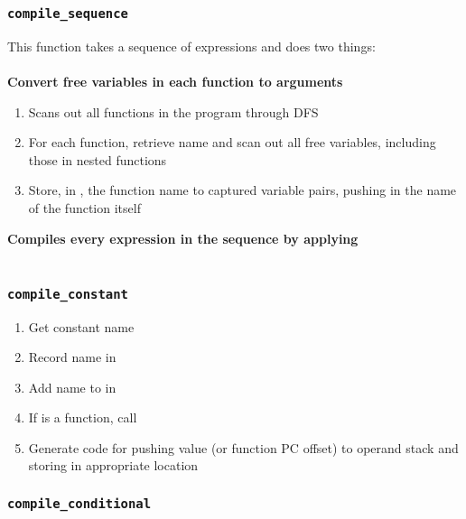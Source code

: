 \subsubsection{\texttt{compile\_sequence}}
This function takes a sequence of expressions and does two things: \\\\
\textbf{Convert free variables in each function to arguments}
\begin{enumerate}
    \item Scans out all functions in the program through DFS
    \item For each function, retrieve name and scan out all free variables, including those in nested functions
    \item Store, in , the function name to captured variable pairs, pushing in the name of the function itself
\end{enumerate}
\textbf{Compiles every expression in the sequence by applying }\\\\
\begin{prooftree}
\end{prooftree}
\subsubsection{\texttt{compile\_constant}}
\begin{enumerate}
    \item Get constant name
    \item Record name in 
    \item Add name to in 
    \item If is a function, call 
    \item Generate code for pushing value (or function PC offset) to operand stack and storing in appropriate location
\end{enumerate}
\subsubsection{\texttt{compile\_conditional}}
\begin{prooftree}
\end{prooftree}\qquad
\begin{prooftree}
\end{prooftree}\qquad
\begin{prooftree}
\end{prooftree}

